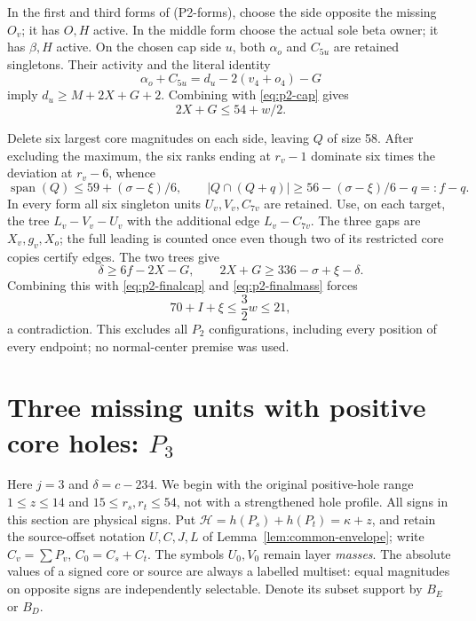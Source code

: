 \documentclass[11pt,letterpaper]{article}
\theoremstyle{definition}\newtheorem{definition}[theorem]{Definition}
\begin{document}
In the first and third forms of (P2-forms), choose the side opposite the
missing $O_v$; it has $O,H$ active. In the middle form choose the actual
sole beta owner; it has $\beta,H$ active. On the chosen cap side $u$,
both $\alpha_o$ and $C_{5u}$ are retained singletons. Their activity and
the literal identity
\[
 \alpha_o+C_{5u}=d_u-2(v_4+o_4)-G
\]
imply $d_u\ge M+2X+G+2$. Combining with
\eqref{eq:p2-cap} gives
\begin{equation}
 2X+G\le54+w/2.                                  \label{eq:p2-finalcap}
\end{equation}

Delete six largest core magnitudes on each side, leaving $Q$ of size 58.
After excluding the maximum, the six ranks ending at $r_v-1$ dominate
six times the deviation at $r_v-6$, whence
\[
 \operatorname{span}(Q)\le59+(\sigma-\xi)/6,\qquad
 |Q\cap(Q+q)|\ge56-(\sigma-\xi)/6-q=:f-q.
\]
In every form all six singleton units $U_v,V_v,C_{7v}$ are retained.
Use, on each target, the tree $L_v-V_v-U_v$ with the additional edge
$L_v-C_{7v}$. The three gaps are $X_v,g_v,X_o$; the full leading is
counted once even though two of its restricted core copies certify edges.
The two trees give
\[
 \delta\ge6f-2X-G,
 \qquad 2X+G\ge336-\sigma+\xi-\delta.
\]
Combining this with \eqref{eq:p2-finalcap} and
\eqref{eq:p2-finalmass} forces
\[
 70+I+\xi\le\frac32w\le21,
\]
a contradiction. This excludes all $P_2$ configurations, including every
position of every endpoint; no normal-center premise was used.


\section{Three missing units with positive core holes: $P_3$}\label{sec:p3}
Here $j=3$ and $\delta=c-234$. We begin with the original positive-hole
range $1\le z\le14$ and $15\le r_s,r_t\le54$, not with a strengthened
hole profile. All signs in this section are physical signs. Put
$\mathcal H=h(P_s)+h(P_t)=\kappa+z$, and retain the source-offset notation
$U,C,J,L$ of Lemma~\ref{lem:common-envelope}; write $C_v=\sum P_v$, $C_0=C_s+C_t$. The symbols $U_0,V_0$ remain layer
\emph{masses}. The absolute values of a signed core or source are always
a labelled multiset: equal magnitudes on opposite signs are independently
selectable. Denote its subset support by $B_E$ or $B_D$.
\end{document}
